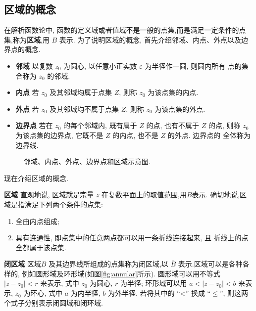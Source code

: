 



\subsection{区域的概念}
\label{sub:domain}
在解析函数论中, 函数的定义域或者值域不是一般的点集,而是满足一定条件的点集,称为{\bf 区域},用 $B$ 表示.
为了说明区域的概念, 首先介绍邻域、内点、外点以及边界点的概念.

\begin{itemize}
\item {\bf 邻域} \quad 以复数 $z_0$ 为圆心, 以任意小正实数 $\varepsilon$ 为半径作一圆, 则圆内所有 点的集合称为 $z_0$ 的邻域.
\item {\bf 内点} \quad 若 $z_0$ 及其邻域均属于点集 $Z$, 则称 $z_0$ 为该点集的内点.
\item {\bf 外点} \quad 若 $z_0$ 及其邻域均不属于点集 $Z$, 则称 $z_0$ 为该点集的外点.
\item {\bf 边界点}  \quad 若在 $z_0$ 的每个邻域内, 既有属于 $Z$ 的点, 也有不属于 $Z$ 的点, 
        则称 $z_0$ 为该点集的边界点, 它既不是 $Z$ 的内点, 也不是 $Z$ 的外点. 边界点的 全体称为边界线.
\end{itemize}

\begin{figure}
    \centering
    
    \caption{邻域、内点、外点、边界点和区域示意图.}
    \label{fig:region}
\end{figure}

现在介绍区域的概念. 

\textbf{区域} \quad 直观地说,  区域就是宗量 $z$ 在复数平面上的取值范围,用$B$表示. 
确切地说,区域是指满足下列两个条件的点集:
    \begin{enumerate}
        \item 全由内点组成;
        \item 具有连通性, 即点集中的任意两点都可以用一条折线连接起来, 且 折线上的点全都属于该点集.
    \end{enumerate}

\textbf{闭区域} \quad 区域$B$ 及其边界线所组成的点集称为闭区域,以 $\bar{B}$ 表示.区域可以是各种各样的, 例如圆形域及环形域(如图\ref{fig:annular}所示). 
圆形域可以用不等式 $\left|z-z_0\right|<r$ 来表示, 式中 $z_0$ 为圆心, $r$ 为半径; 
环形域可以用 $a<\left|z-z_0\right|<b$ 来表示, $z_0$ 为环心, 式中 $a$ 为内半径, $b$ 为外半径.
 若将其中的 “<” 换成 $“ \leqslant ”$, 则这两个式子分别表示闭圆域和闭环域.

